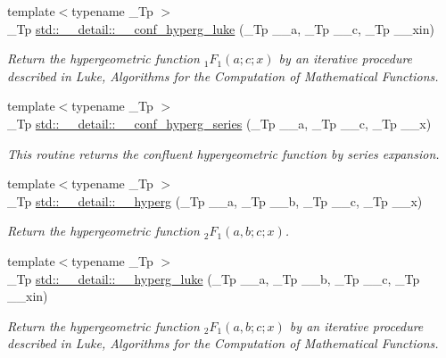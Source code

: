 \begin{DoxyCompactItemize}
{\footnotesize template$<$typename \+\_\+\+Tp $>$ }\\\+\_\+\+Tp \hyperlink{namespacestd_1_1____detail_ac3b4c72998f9d7deb6d79bda93220e58}{std\+::\+\_\+\+\_\+detail\+::\+\_\+\+\_\+conf\+\_\+hyperg\+\_\+luke} (\+\_\+\+Tp \+\_\+\+\_\+a, \+\_\+\+Tp \+\_\+\+\_\+c, \+\_\+\+Tp \+\_\+\+\_\+xin)
\begin{DoxyCompactList}\small\item\em Return the hypergeometric function $ {}_1F_1(a;c;x) $ by an iterative procedure described in Luke, Algorithms for the Computation of Mathematical Functions. \end{DoxyCompactList}\item 
{\footnotesize template$<$typename \+\_\+\+Tp $>$ }\\\+\_\+\+Tp \hyperlink{namespacestd_1_1____detail_a5f701a63e17238132405dd209660fc1d}{std\+::\+\_\+\+\_\+detail\+::\+\_\+\+\_\+conf\+\_\+hyperg\+\_\+series} (\+\_\+\+Tp \+\_\+\+\_\+a, \+\_\+\+Tp \+\_\+\+\_\+c, \+\_\+\+Tp \+\_\+\+\_\+x)
\begin{DoxyCompactList}\small\item\em This routine returns the confluent hypergeometric function by series expansion. \end{DoxyCompactList}\item 
{\footnotesize template$<$typename \+\_\+\+Tp $>$ }\\\+\_\+\+Tp \hyperlink{namespacestd_1_1____detail_a316589a60d5e5f50201c2d42b980678c}{std\+::\+\_\+\+\_\+detail\+::\+\_\+\+\_\+hyperg} (\+\_\+\+Tp \+\_\+\+\_\+a, \+\_\+\+Tp \+\_\+\+\_\+b, \+\_\+\+Tp \+\_\+\+\_\+c, \+\_\+\+Tp \+\_\+\+\_\+x)
\begin{DoxyCompactList}\small\item\em Return the hypergeometric function $ {}_2F_1(a,b;c;x) $. \end{DoxyCompactList}\item 
{\footnotesize template$<$typename \+\_\+\+Tp $>$ }\\\+\_\+\+Tp \hyperlink{namespacestd_1_1____detail_a0c1ec62b5c39c93ad70a8229a7a6d84d}{std\+::\+\_\+\+\_\+detail\+::\+\_\+\+\_\+hyperg\+\_\+luke} (\+\_\+\+Tp \+\_\+\+\_\+a, \+\_\+\+Tp \+\_\+\+\_\+b, \+\_\+\+Tp \+\_\+\+\_\+c, \+\_\+\+Tp \+\_\+\+\_\+xin)
\begin{DoxyCompactList}\small\item\em Return the hypergeometric function $ {}_2F_1(a,b;c;x) $ by an iterative procedure described in Luke, Algorithms for the Computation of Mathematical Functions. \end{DoxyCompactList}\item 

\end{DoxyCompactItemize}
